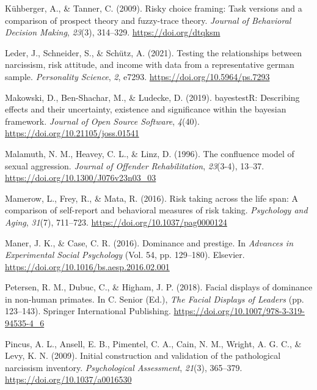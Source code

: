 \documentclass[
  donotrepeattitle,doc, 12pt, a4paper,floatsintext]{apa7}
\newlength{\cslhangindent}
\newlength{\cslentryspacingunit} %
\newenvironment{CSLReferences}[2] %
 {%
  \setlength{\parindent}{0pt}
  \ifodd #1
  \let\oldpar\par
  \def\par{\hangindent=\cslhangindent\oldpar}
  \fi
  \setlength{\parskip}{#2\cslentryspacingunit}
 }%
 {}
\begin{document}
\begin{CSLReferences}{1}{0}
\leavevmode{}%
Kühberger, A., \& Tanner, C. (2009). Risky choice framing: Task versions and a comparison of prospect theory and fuzzy-trace theory. \emph{Journal of Behavioral Decision Making}, \emph{23}(3), 314--329. \url{https://doi.org/dtqksm}

\leavevmode{}%
Leder, J., Schneider, S., \& Schütz, A. (2021). Testing the relationships between narcissism, risk attitude, and income with data from a representative german sample. \emph{Personality Science}, \emph{2}, e7293. \url{https://doi.org/10.5964/ps.7293}

\leavevmode{}%
Makowski, D., Ben-Shachar, M., \& Ludecke, D. (2019). {bayestestR}: Describing effects and their uncertainty, existence and significance within the bayesian framework. \emph{Journal of Open Source Software}, \emph{4}(40). \url{https://doi.org/10.21105/joss.01541}

\leavevmode{}%
Malamuth, N. M., Heavey, C. L., \& Linz, D. (1996). The confluence model of sexual aggression. \emph{Journal of Offender Rehabilitation}, \emph{23}(3-4), 13--37. \url{https://doi.org/10.1300/J076v23n03_03}

\leavevmode{}%
Mamerow, L., Frey, R., \& Mata, R. (2016). Risk taking across the life span: A comparison of self-report and behavioral measures of risk taking. \emph{Psychology and Aging}, \emph{31}(7), 711--723. \url{https://doi.org/10.1037/pag0000124}

\leavevmode{}%
Maner, J. K., \& Case, C. R. (2016). Dominance and prestige. In \emph{Advances in {Experimental Social Psychology}} (Vol. 54, pp. 129--180). {Elsevier}. \url{https://doi.org/10.1016/bs.aesp.2016.02.001}

\leavevmode{}%
Petersen, R. M., Dubuc, C., \& Higham, J. P. (2018). Facial displays of dominance in non-human primates. In C. Senior (Ed.), \emph{The {Facial Displays} of {Leaders}} (pp. 123--143). {Springer International Publishing}. \url{https://doi.org/10.1007/978-3-319-94535-4_6}

\leavevmode{}%
Pincus, A. L., Ansell, E. B., Pimentel, C. A., Cain, N. M., Wright, A. G. C., \& Levy, K. N. (2009). Initial construction and validation of the pathological narcissism inventory. \emph{Psychological Assessment}, \emph{21}(3), 365--379. \url{https://doi.org/10.1037/a0016530}


\end{CSLReferences}
\end{document}
